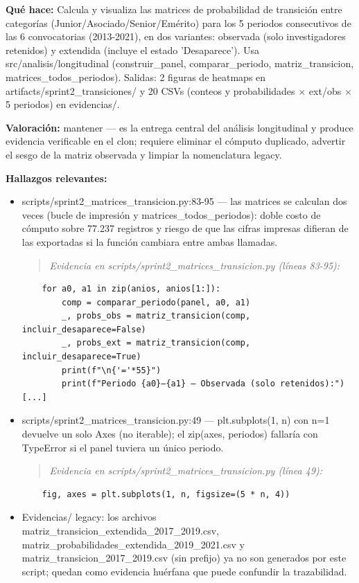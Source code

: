 \textbf{Qué hace:} Calcula y visualiza las matrices de probabilidad de transición entre categorías (Junior/Asociado/Senior/Emérito) para los 5 periodos consecutivos de las 6 convocatorias (2013-2021), en dos variantes: observada (solo investigadores retenidos) y extendida (incluye el estado 'Desaparece'). Usa src/analisis/longitudinal (construir\_panel, comparar\_periodo, matriz\_transicion, matrices\_todos\_periodos). Salidas: 2 figuras de heatmaps en artifacts/sprint2\_transiciones/ y 20 CSVs (conteos y probabilidades $\times$ ext/obs $\times$ 5 periodos) en evidencias/.

\textbf{Valoración:} mantener --- es la entrega central del análisis longitudinal y produce evidencia verificable en el clon; requiere eliminar el cómputo duplicado, advertir el sesgo de la matriz observada y limpiar la nomenclatura legacy.

\textbf{Hallazgos relevantes:}
\begin{itemize}
  \item scripts/sprint2\_matrices\_transicion.py:83-95 --- las matrices se calculan dos veces (bucle de impresión y matrices\_todos\_periodos): doble costo de cómputo sobre 77.237 registros y riesgo de que las cifras impresas difieran de las exportadas si la función cambiara entre ambas llamadas.
\begin{quote}\footnotesize\ttfamily
\noindent\emph{Evidencia en scripts/sprint2\_matrices\_transicion.py (líneas 83-95):}
\end{quote}
\begin{lstlisting}
    for a0, a1 in zip(anios, anios[1:]):
        comp = comparar_periodo(panel, a0, a1)
        _, probs_obs = matriz_transicion(comp, incluir_desaparece=False)
        _, probs_ext = matriz_transicion(comp, incluir_desaparece=True)
        print(f"\n{'='*55}")
        print(f"Periodo {a0}–{a1} — Observada (solo retenidos):")
[...]
\end{lstlisting}

  \item scripts/sprint2\_matrices\_transicion.py:49 --- plt.subplots(1, n) con n=1 devuelve un solo Axes (no iterable); el zip(axes, periodos) fallaría con TypeError si el panel tuviera un único periodo.
\begin{quote}\footnotesize\ttfamily
\noindent\emph{Evidencia en scripts/sprint2\_matrices\_transicion.py (línea 49):}
\end{quote}
\begin{lstlisting}
    fig, axes = plt.subplots(1, n, figsize=(5 * n, 4))
\end{lstlisting}

  \item Evidencias/ legacy: los archivos matriz\_transicion\_extendida\_2017\_2019.csv, matriz\_probabilidades\_extendida\_2019\_2021.csv y matriz\_transicion\_2017\_2019.csv (sin prefijo) ya no son generados por este script; quedan como evidencia huérfana que puede confundir la trazabilidad.
\end{itemize}


